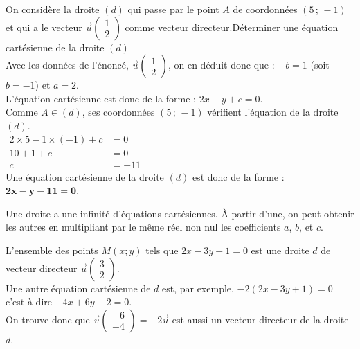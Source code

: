 \begin{Exemple}
On considère la droite $(d)$ qui passe par le point $A$ de coordonnées $(5\,;\,-1)$ et qui a le vecteur $\vec u \begin{pmatrix}1\\2\end{pmatrix}$ comme vecteur directeur.Déterminer une équation cartésienne de la droite $(d)$\\

Avec les données de l'énoncé, $\vec u \begin{pmatrix}1\\2\end{pmatrix}$, on en déduit donc que : $-b = 1$ (soit $b=-1$) et $a=2$. \\L'équation cartésienne est donc de la forme : $ 2 x - y + c=0$. \\Comme $A\in (d)$, ses coordonnées $(5\,;\,-1)$ vérifient l'équation de la droite $(d)$.  \\$\begin{aligned}
       2 \times 5 -1 \times (-1)+ c&=0\\
        10 +1 + c&=0\\
        c&= -11
        \end{aligned}$ \\Une équation cartésienne de la droite $(d)$ est donc de la forme : $\boldsymbol{2x-y-11=0}$.

\end{Exemple}


\begin{Remarque}
Une droite a une infinité d'équations cartésiennes. À partir d'une, on peut obtenir les autres en multipliant par le même réel non nul les coefficients $a$, $b$, et $c$.
\end{Remarque}


\begin{Exemple}
L'ensemble des points $M(x;y)$ tels que $2x-3y+1=0$ est une droite $d$ de vecteur directeur $\overrightarrow{u}\begin{pmatrix}
3 \\
2
\end{pmatrix}$. \\Une autre équation cartésienne de $d$ est, par exemple, $-2(2x-3y+1)=0$ c'est à dire $-4x+6y-2=0$.\\ On trouve donc que $\overrightarrow{v}\begin{pmatrix}
-6 \\
-4
\end{pmatrix}=-2\overrightarrow{u}$ est aussi un vecteur directeur de la droite $d$.
\end{Exemple}

